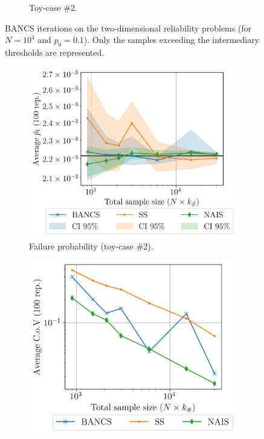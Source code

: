\begin{figure}
\begin{subfigure}[b]{0.49\linewidth}
        \caption{Toy-case \#2.}
    \end{subfigure}
    \caption{BANCS iterations on the two-dimensional reliability problems (for $N=10^4$ and $p_0=0.1$). 
    Only the samples exceeding the intermediary thresholds are represented.}
    \label{fig:2D_toycase_reliability}
\end{figure}


\begin{figure}
    \centering
    \begin{subfigure}[b]{0.49\linewidth}
        \centering
        \includegraphics[width=\linewidth]{part3/figures/BANCS/RP4B_mean.png}
        \caption{Failure probability (toy-case \#2).}
    \end{subfigure}
    \begin{subfigure}[b]{0.47\linewidth}
        \centering
        \includegraphics[width=\linewidth]{part3/figures/BANCS/RP4B_cov.png}

\end{subfigure}
\end{figure}
